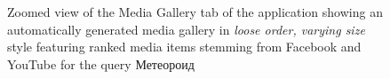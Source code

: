 \documentclass{sig-alt-release2}
\begin{document}
\begin{figure}[t!]
  \centering
  \setlength{\fboxsep}{1pt}
  \caption{Zoomed view of the Media Gallery tab of the application
    showing an automatically generated media gallery in \emph{loose order, varying size} style
    featuring ranked media items stemming from Facebook and YouTube for the query
    \selectfont Метеороид \selectfont}
  \label{fig:media-gallery}
\end{figure}

\begin{spacing}{0.964}


\end{spacing}
\end{document}

